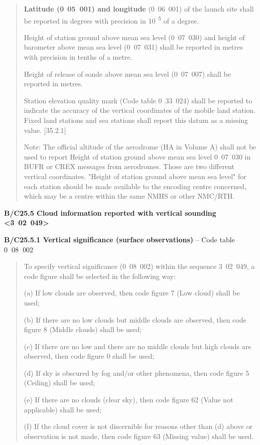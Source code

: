 \begin{quote}
\textbf{Latitude (0}~\textbf{05~001) and longitude} (0~06~001) of the launch site shall be reported in degrees with precision in 10\textsuperscript{--5} of a degree.

Height of station ground above mean sea level (0~07~030) and height of barometer above mean sea level (0~07~031) shall be reported in metres with precision in tenths of a metre.

Height of release of sonde above mean sea level (0~07~007) shall be reported in metres.

Station elevation quality mark (Code table 0~33~024) shall be reported to indicate the accuracy of the vertical coordinates of the mobile land station. Fixed land stations and sea stations shall report this datum as a missing value. {[}35.2.1{]}

Note: The official altitude of the aerodrome (HA in Volume A) shall not be used to report Height of station ground above mean sea level 0~07~030 in BUFR or CREX messages from aerodromes. Those are two different vertical coordinates. "Height of station ground above mean sea level" for each station should be made available to the encoding centre concerned, which may be a centre within the same NMHS or other NMC/RTH.
\end{quote}

\textbf{B/C25.5 Cloud information reported with vertical sounding \textless3~02~049\textgreater{}}

\textbf{B/C25.5.1 Vertical significance (surface observations)} -- Code table 0\textbf{~}08\textbf{~}002

\begin{quote}
To specify vertical significance (0~08~002) within the sequence 3~02~049, a code figure shall be selected in the following way:

(a) If low clouds are observed, then code figure 7 (Low cloud) shall be used;

(b) If there are no low clouds but middle clouds are observed, then code figure 8 (Middle clouds) shall be used;

(c) If there are no low and there are no middle clouds but high clouds are observed, then code figure 0 shall be used;

(d) If sky is obscured by fog and/or other phenomena, then code figure 5 (Ceiling) shall be used;

(e) If there are no clouds (clear sky), then code figure 62 (Value not applicable) shall be used;

(f) If the cloud cover is not discernible for reasons other than (d) above or observation is not made, then code figure 63 (Missing value) shall be used.
\end{quote}

